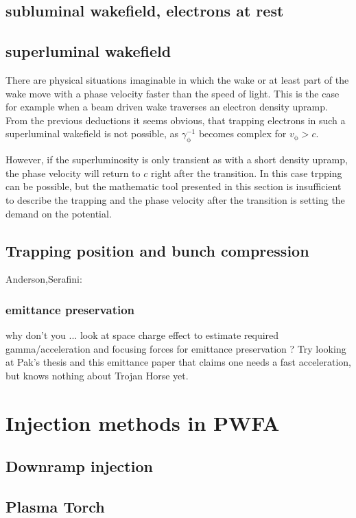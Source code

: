 \subsection*{subluminal wakefield, electrons at rest}

\subsection*{superluminal wakefield}
There are physical situations imaginable in which the wake or at least part of the wake move with a phase velocity faster than the speed of light. This is the case for example when a beam driven wake traverses an electron density upramp.
From the previous deductions it seems obvious, that trapping electrons in such a superluminal wakefield is not possible, as $\gamma_\mathrm{\phi}^{-1}$ becomes complex for $v_\mathrm{\phi}>c$.

However, if the superluminosity is only transient as with a short density upramp, the phase velocity will return to $c$ right after the transition. In this case trpping can be possible, but the mathematic tool presented in this section is insufficient to describe the trapping and the phase velocity after the transition is setting the demand on the potential.
\subsection{Trapping position and bunch compression}

Anderson,Serafini:\cite{AndersonVelocBunchPPRSTAB2005,serafini2001velocity}

\subsubsection{emittance preservation}
why don't you ... look at space charge effect to estimate required gamma/acceleration and focusing forces for emittance preservation ? Try looking at Pak's thesis and this emittance paper that claims one needs a fast acceleration, but knows nothing about Trojan Horse yet.
\section{Injection methods in PWFA}
\subsection{Downramp injection}
\subsection{Plasma Torch}
